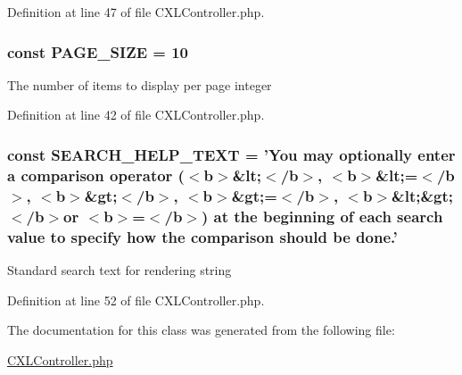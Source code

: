 Definition at line 47 of file CXLController.php.

\hypertarget{classCXLController_a4634a091c35db33009455321e1d259e3}{
\subsubsection[{PAGE\_\-SIZE}]{\setlength{\rightskip}{0pt plus 5cm}const {\bf PAGE\_\-SIZE} = 10}}
\label{classCXLController_a4634a091c35db33009455321e1d259e3}
The number of items to display per page  integer 

Definition at line 42 of file CXLController.php.

\hypertarget{classCXLController_a21930d5a45a39f983d1b157fd28819dc}{
\subsubsection[{SEARCH\_\-HELP\_\-TEXT}]{\setlength{\rightskip}{0pt plus 5cm}const {\bf SEARCH\_\-HELP\_\-TEXT} = 'You may optionally enter a comparison operator ($<$b$>$\&lt;$<$/b$>$, $<$b$>$\&lt;=$<$/b$>$, $<$b$>$\&gt;$<$/b$>$, $<$b$>$\&gt;=$<$/b$>$, $<$b$>$\&lt;\&gt;$<$/b$>$or $<$b$>$=$<$/b$>$) at the beginning of each search value to specify how the comparison should be done.'}}
\label{classCXLController_a21930d5a45a39f983d1b157fd28819dc}
Standard search text for rendering  string 

Definition at line 52 of file CXLController.php.



The documentation for this class was generated from the following file:\begin{DoxyCompactItemize}
\item 
\hyperlink{CXLController_8php}{CXLController.php}\end{DoxyCompactItemize}
